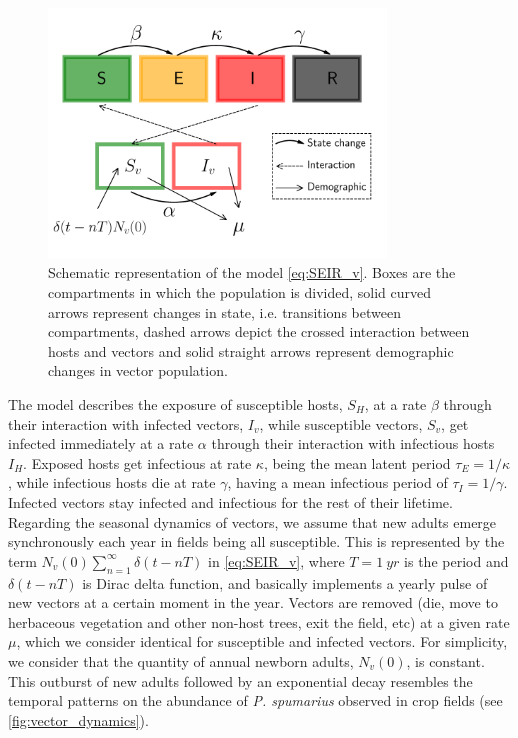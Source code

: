 \begin{figure}
    \centering
    \label{fig:model_diagram_phyto}
    \includegraphics[width=0.8\textwidth]{Figures/SEIR_v_scheme.pdf}
    \caption{Schematic representation of the model \cref{eq:SEIR_v}. Boxes
        are the compartments in which the population is divided, solid curved
        arrows
        represent changes in state, i.e. transitions between compartments,
        dashed
        arrows depict the crossed interaction between hosts and vectors and
        solid
        straight arrows represent demographic changes in vector population.}
\end{figure}

The model describes the exposure of susceptible hosts, $S_H$, at a rate
$\beta$ through their interaction with infected vectors, $I_v$, while
susceptible vectors, $S_v$, get infected immediately at a rate $\alpha$ through
their interaction with infectious hosts $I_H$. Exposed hosts get infectious at
rate $\kappa$, being the mean latent period $\tau_E=1/\kappa$, while infectious
hosts die at rate $\gamma$, having a mean infectious period of
$\tau_I=1/\gamma$. Infected vectors stay infected and infectious for the rest
of their lifetime. Regarding the seasonal dynamics of vectors, we assume that
new adults emerge synchronously each year in fields being all susceptible. This
is represented by the term $N_v(0)\sum_{n=1}^{\infty}\delta(t-nT)$ in
\cref{eq:SEIR_v}, where $T=\SI{1}{yr}$ is the period and $\delta(t-nT)$ is
Dirac delta function, and basically implements a yearly pulse of new vectors at
a certain moment in the year. Vectors are removed (die, move to herbaceous
vegetation and other non-host trees, exit the field, etc) at a given rate
$\mu$, which we consider identical for susceptible and infected vectors. For
simplicity, we consider that the quantity of annual newborn adults, $N_v(0)$,
is constant. This outburst of new adults followed by an exponential decay
resembles the temporal patterns on the abundance of \textit{P. spumarius}
observed in crop fields  \cite{Antonatos2021,Beal2021,Cornara2017,Lopez2021}
(see \cref{fig:vector_dynamics}).

